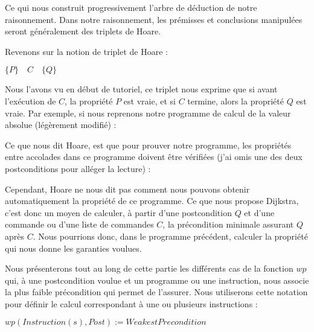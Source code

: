 Ce qui nous construit progressivement l'arbre de déduction de notre raisonnement.
Dans notre raisonnement, les prémisses et conclusions manipulées seront
généralement des triplets de Hoare.





Revenons sur la notion de triplet de Hoare :




\begin{center}
$\{ P \}\quad  C\quad \{ Q \}$


\end{center}


Nous l'avons vu en début de tutoriel, ce triplet nous exprime que si avant
l'exécution de $C$, la propriété $P$ est vraie, et si $C$ termine, alors la
propriété $Q$ est vraie. Par exemple, si nous reprenons notre programme de
calcul de la valeur absolue (légèrement modifié) :






Ce que nous dit Hoare, est que pour prouver notre programme, les propriétés
entre accolades dans ce programme doivent être vérifiées (j'ai omis une des
deux postconditions pour alléger la lecture) :






Cependant, Hoare ne nous dit pas comment nous pouvons obtenir automatiquement la
propriété  de ce programme. Ce que nous propose Dijkstra, c'est donc un moyen
de calculer, à partir d'une postcondition $Q$ et d'une commande ou d'une liste de
commandes $C$, la précondition minimale assurant $Q$ après $C$. Nous pourrions
donc, dans le programme précédent, calculer la propriété  qui nous donne les
garanties voulues.



Nous présenterons tout au long de cette partie les différents cas de la
fonction $wp$ qui, à une postcondition voulue et un programme ou une instruction,
nous associe la plus faible précondition qui permet de l'assurer. Nous utiliserons
cette notation pour définir le calcul correspondant à une ou plusieurs instructions :



$wp(Instruction(s), Post) := WeakestPrecondition$



